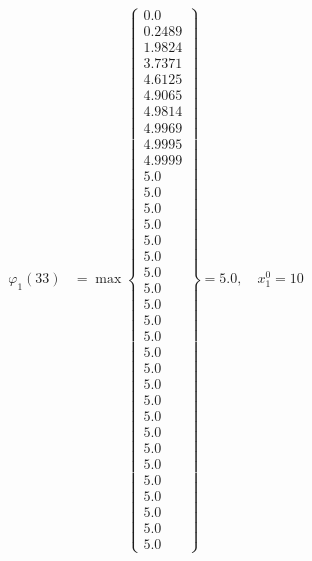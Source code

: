 \documentclass{article}
\begin{document}
\begin{align*}
  
\varphi_{1}(33) &= \max \left\{ \begin{array}{c}
0.0 \\
 0.2489 \\
 1.9824 \\
 3.7371 \\
 4.6125 \\
 4.9065 \\
 4.9814 \\
 4.9969 \\
 4.9995 \\
 4.9999 \\
 5.0 \\
 5.0 \\
 5.0 \\
 5.0 \\
 5.0 \\
 5.0 \\
 5.0 \\
 5.0 \\
 5.0 \\
 5.0 \\
 5.0 \\
 5.0 \\
 5.0 \\
 5.0 \\
 5.0 \\
 5.0 \\
 5.0 \\
 5.0 \\
 5.0 \\
 5.0 \\
 5.0 \\
 5.0 \\
 5.0 \\
 5.0
\end{array} \right\}=5.0,\quad x_{1}^0=10\\
  
  
  

\end{align*}
\end{document}
